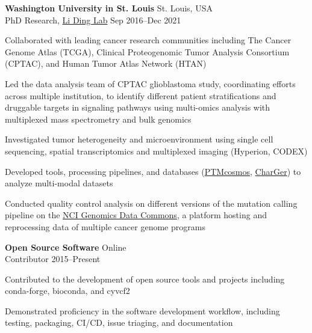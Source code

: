 \begin{entrylist}
\item \textbf{Washington University in St. Louis} \hfill St. Louis, USA\\
PhD Research, \href{https://dinglab.wustl.edu/}{Li Ding Lab} \hfill
Sep 2016--Dec 2021
\begin{detaillist}
    \item Collaborated with leading cancer research communities including The Cancer Genome Atlas (TCGA), Clinical Proteogenomic Tumor Analysis Consortium (CPTAC), and Human Tumor Atlas Network (HTAN)
    \item Led the data analysis team of CPTAC glioblastoma study, coordinating efforts across multiple institution, to identify different patient stratifications and druggable targets in signaling pathways using multi-omics analysis with multiplexed mass spectrometry and bulk genomics
    \item Investigated tumor heterogeneity and microenvironment using single cell sequencing, spatial transcriptomics and multiplexed imaging (Hyperion, CODEX)
    \item Developed tools, processing pipelines, and databases (\href{https://ptmcosmos.wustl.edu/}{PTMcosmos}, \href{https://github.com/ding-lab/CharGer}{CharGer}) to analyze multi-modal datasets
    \item Conducted quality control analysis on different versions of the mutation calling pipeline on the \href{https://gdc.cancer.gov/}{NCI Genomics Data Commons}, a platform hosting and reprocessing data of multiple cancer genome programs
\end{detaillist}

\item \textbf{Open Source Software} \hfill Online\\
Contributor \hfill 2015--Present
\begin{detaillist}
    \item Contributed to the development of open source tools and projects including conda-forge, bioconda, and cyvcf2
    \item Demonstrated proficiency in the software development workflow, including testing, packaging, CI/CD, issue triaging, and documentation
\end{detaillist}


\end{entrylist}
